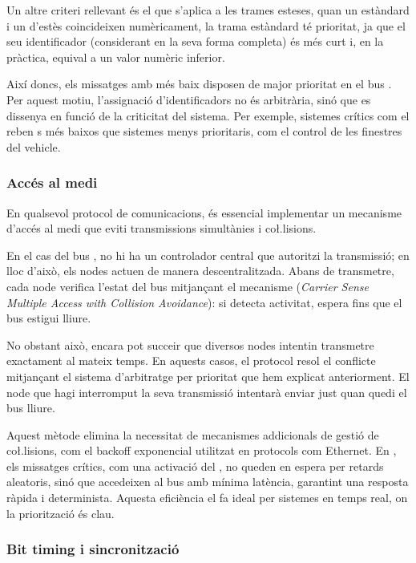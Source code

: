 \documentclass{tfgitic}[2024/07/01]
\begin{document}
Un altre criteri rellevant és el que s'aplica a les trames esteses, quan un  estàndard i un d'estès coincideixen numèricament, la trama estàndard té prioritat, 
ja que el seu identificador (considerant en la seva forma completa) és més curt i, en la pràctica, equival a un valor numèric inferior.

Així doncs, els missatges amb  més baix disposen de major prioritat en el bus . Per aquest motiu, l'assignació d'identificadors no és arbitrària, sinó que es 
dissenya en funció de la criticitat del sistema. Per exemple, sistemes crítics com el  reben s més baixos que sistemes menys prioritaris, 
com el control de les finestres del vehicle.

\subsubsection{Accés al medi}

En qualsevol protocol de comunicacions, és essencial implementar un mecanisme d'accés al medi que eviti transmissions simultànies i co\l.lisions.

En el cas del bus , no hi ha un controlador central que autoritzi la transmissió; en lloc d'això, els nodes actuen de manera descentralitzada. Abans de transmetre, 
cada node verifica l'estat del bus mitjançant el mecanisme  (\textit{Carrier Sense Multiple Access with Collision Avoidance}): si detecta activitat, espera 
fins que el bus estigui lliure.

No obstant això, encara pot succeir que diversos nodes intentin transmetre exactament al mateix temps. En aquests casos, el protocol  resol el conflicte mitjançant 
el sistema d'arbitratge per prioritat que hem explicat anteriorment. El node que hagi interromput la seva transmissió intentarà enviar just quan quedi el bus lliure.

Aquest mètode elimina la necessitat de mecanismes addicionals de gestió de co\l.lisions, com el backoff exponencial utilitzat en protocols com Ethernet. En , els 
missatges crítics, com una activació del , no queden en espera per retards aleatoris, sinó que accedeixen al bus amb mínima latència, garantint una resposta ràpida 
i determinista. Aquesta eficiència el fa ideal per sistemes en temps real, on la priorització és clau.

\subsubsection{Bit timing i sincronització}
\end{document}
